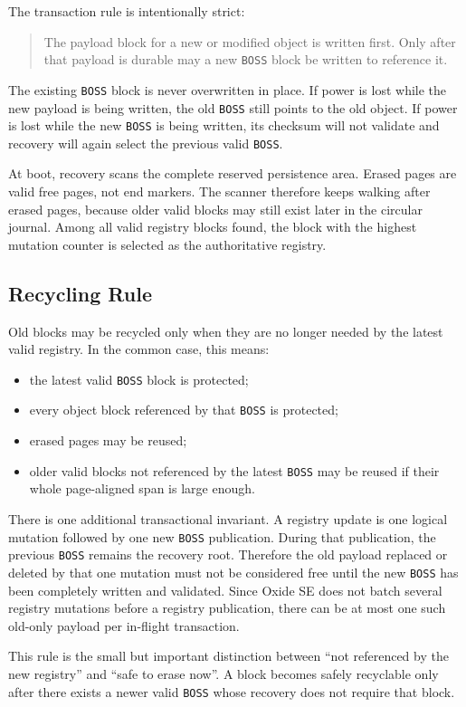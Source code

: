 The transaction rule is intentionally strict:

\begin{quote}
The payload block for a new or modified object is written first. Only after
that payload is durable may a new \texttt{BOSS} block be written to reference
it.
\end{quote}

The existing \texttt{BOSS} block is never overwritten in place. If power is
lost while the new payload is being written, the old \texttt{BOSS} still
points to the old object. If power is lost while the new \texttt{BOSS} is
being written, its checksum will not validate and recovery will again select
the previous valid \texttt{BOSS}.

At boot, recovery scans the complete reserved persistence area. Erased pages
are valid free pages, not end markers. The scanner therefore keeps walking
after erased pages, because older valid blocks may still exist later in the
circular journal. Among all valid registry blocks found, the block with the
highest mutation counter is selected as the authoritative registry.

\subsection{Recycling Rule}
\label{subsec:persistence-recycling-rule}

Old blocks may be recycled only when they are no longer needed by the latest
valid registry. In the common case, this means:

\begin{itemize}
\item the latest valid \texttt{BOSS} block is protected;
\item every object block referenced by that \texttt{BOSS} is protected;
\item erased pages may be reused;
\item older valid blocks not referenced by the latest \texttt{BOSS} may be
  reused if their whole page-aligned span is large enough.
\end{itemize}

There is one additional transactional invariant. A registry update is one
logical mutation followed by one new \texttt{BOSS} publication. During that
publication, the previous \texttt{BOSS} remains the recovery root. Therefore
the old payload replaced or deleted by that one mutation must not be
considered free until the new \texttt{BOSS} has been completely written and
validated. Since Oxide SE does not batch several registry mutations before a
registry publication, there can be at most one such old-only payload per
in-flight transaction.

This rule is the small but important distinction between ``not referenced by
the new registry'' and ``safe to erase now''. A block becomes safely
recyclable only after there exists a newer valid \texttt{BOSS} whose recovery
does not require that block.
